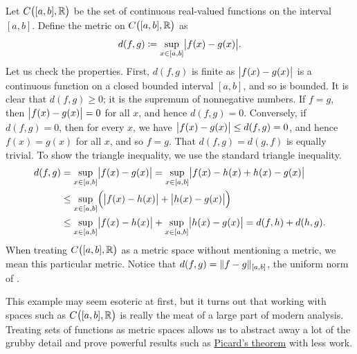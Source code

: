 \begin{example} \label{example:msC01}
Let $C\bigl([a,b],{\mathbb{R}}\bigr)$ be the set of
continuous real-valued functions on the interval $[a,b]$.
Define the metric on $C\bigl([a,b],{\mathbb{R}}\bigr)$ as
\begin{equation*}
d(f,g) \coloneqq \sup_{x \in [a,b]} \bigl\lvert {f(x)-g(x)} \bigr\rvert .
\end{equation*}
Let us check the properties.  First, $d(f,g)$ is finite as
$\bigl\lvert {f(x)-g(x)} \bigr\rvert$ is a continuous function on a closed bounded interval
$[a,b]$, and so is bounded.
It is clear that $d(f,g) \geq 0$;
it is the supremum of nonnegative numbers.  If $f = g$,
then $\bigl\lvert {f(x)-g(x)} \bigr\rvert = 0$ for all $x$, and hence $d(f,g) = 0$.  Conversely,
if $d(f,g) = 0$, then for every $x$, we have $\bigl\lvert {f(x)-g(x)} \bigr\rvert \leq d(f,g) = 0$,
and hence $f(x) = g(x)$ for all $x$, and so $f=g$.  That $d(f,g) = d(g,f)$
is equally trivial.  To show the triangle inequality, we use the standard
triangle inequality.
\begin{equation*}
\begin{split}
d(f,g) & =
\sup_{x \in [a,b]} \bigl\lvert {f(x)-g(x)} \bigr\rvert =
\sup_{x \in [a,b]} \bigl\lvert {f(x)-h(x)+h(x)-g(x)} \bigr\rvert
\\
& \leq
\sup_{x \in [a,b]} \Bigl( \bigl\lvert {f(x)-h(x)} \bigr\rvert+\bigl\lvert {h(x)-g(x)} \bigr\rvert \Bigr)
\\
& \leq
\sup_{x \in [a,b]} \bigl\lvert {f(x)-h(x)} \bigr\rvert+
\sup_{x \in [a,b]} \bigl\lvert {h(x)-g(x)} \bigr\rvert = d(f,h) + d(h,g) .
\end{split}
\end{equation*}
When treating $C\bigl([a,b],{\mathbb{R}}\bigr)$ as a metric space without mentioning a metric,
we mean this particular metric.
Notice that $d(f,g) = \lVert {f-g} \rVert_{[a,b]}$, the uniform norm of .

This example may seem esoteric at first, but it turns out that working with
spaces such as $C\bigl([a,b],{\mathbb{R}}\bigr)$ is really the meat of a large part of modern 
analysis.  Treating sets of functions as metric spaces allows us to
abstract away a lot of the grubby detail and prove powerful results such as
\hyperref[thm:fs:picard]{Picard's theorem} with less work.
\end{example}

